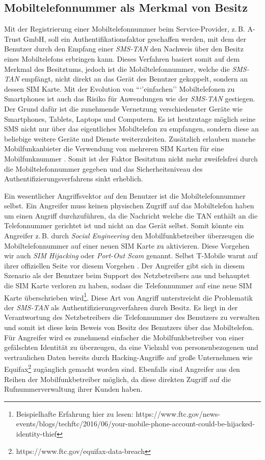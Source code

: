 \documentclass[11pt,a4paper,ngerman]{scrreprt}
\begin{document}
\subsection{Mobiltelefonnummer als Merkmal von Besitz}
Mit der Registrierung einer Mobiltelefonnummer beim Service-Provider, z.\,B. A-Trust GmbH, soll ein Authentifikationsfaktor geschaffen werden, mit dem der Benutzer durch den Empfang einer \textit{SMS-TAN} den Nachweis über den Besitz eines Mobiltelefons erbringen kann. Dieses Verfahren basiert somit auf dem Merkmal des Besitztums, jedoch ist die Mobiltelefonnummer, welche die \textit{SMS-TAN} empfängt, nicht direkt an das Gerät des Benutzer gekoppelt, sondern an dessen SIM Karte. Mit der Evolution von ```'einfachen'' Mobiltelefonen zu Smartphones ist auch das Risiko für Anwendungen wie der \textit{SMS-TAN} gestiegen. Der Grund dafür ist die zunehmende Vernetzung verschiedenster Geräte wie Smartphones, Tablets, Laptops und Computern. Es ist heutzutage möglich seine SMS nicht nur über das eigentliches Mobiltelefon zu empfangen, sondern diese an beliebige weitere Geräte und Dienste weiterzuleiten. Zusätzlich erlauben manche Mobilfunkanbieter die Verwendung von mehreren SIM Karten für eine Mobilfunknummer \cite{tmobileMultiSim}. Somit ist der Faktor Besitztum nicht mehr zweifelsfrei durch die Mobiltelefonnummer gegeben und das Sicherheitsniveau des Authentifizierungsverfahrens sinkt erheblich.

Ein wesentlicher Angriffsvektor auf den Benutzer ist die Mobiltelefonnummer selbst. Ein Angreifer muss keinen physischen Zugriff auf das Mobiltelefon haben um einen Angriff durchzuführen, da die Nachricht welche die TAN enthält an die Telefonnummer gerichtet ist und nicht an das Gerät selbst. Somit könnte ein Angreifer z.\,B. durch \emph{Social Engineering} den Mobilfunkbetreiber überzeugen die Mobiltelefonnummer auf einer neuen SIM Karte zu aktivieren. Diese Vorgehen wir auch \emph{SIM Hijacking} oder \emph{Port-Out Scam} genannt. Selbst T-Mobile warnt auf ihrer offiziellen Seite vor diesem Vorgehen \cite{telekomPortOut}. Der Angreifer gibt sich in diesem Szenario als der Benutzer beim Support des Netzbetreibers aus und behauptet die SIM Karte verloren zu haben, sodass die Telefonnummer auf eine neue SIM Karte überschrieben wird\footnote{Beispielhafte Erfahrung hier zu lesen: https://www.ftc.gov/news-events/blogs/techftc/2016/06/your-mobile-phone-account-could-be-hijacked-identity-thief}. Diese Art von Angriff unterstreicht die Problematik der \textit{SMS-TAN} als Authentifizierungsverfahren durch Besitz. Es liegt in der Verantwortung des Netzbetreibers die Telefonnummer des Benutzers zu verwalten und somit ist diese kein Beweis von Besitz des Benutzers über das Mobiltelefon. Für Angreifer wird es zunehmend einfacher die Mobilfunkbetreiber von einer gefälschten Identität zu überzeugen, da eine Vielzahl von personenbezogenen und vertraulichen Daten bereits durch Hacking-Angriffe auf große Unternehmen wie Equifax\footnote{https://www.ftc.gov/equifax-data-breach} zugänglich gemacht worden sind. Ebenfalls sind Angreifer aus den Reihen der Mobilfunkbetreiber möglich, da diese direkten Zugriff auf die Rufnummerverwaltung ihrer Kunden haben.
\end{document}
